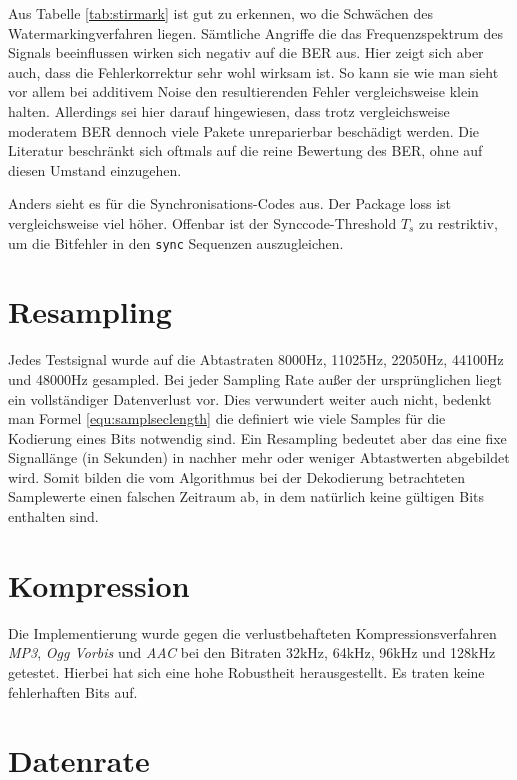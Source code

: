Aus Tabelle \ref{tab:stirmark} ist gut zu erkennen, wo die Schwächen des Watermarkingverfahren liegen. Sämtliche Angriffe die das Frequenzspektrum des Signals beeinflussen wirken sich negativ auf die BER aus. Hier zeigt sich aber auch, dass die Fehlerkorrektur sehr wohl wirksam ist. So kann sie wie man sieht vor allem bei additivem Noise den resultierenden Fehler vergleichsweise klein halten. 
Allerdings sei hier darauf hingewiesen, dass trotz vergleichsweise moderatem BER dennoch viele Pakete unreparierbar beschädigt werden. Die Literatur beschränkt sich oftmals auf die reine Bewertung des BER, ohne auf diesen Umstand einzugehen. 

Anders sieht es für die Synchronisations-Codes aus. Der Package loss ist vergleichsweise viel höher. Offenbar ist der Synccode-Threshold ${T}_{s}$ zu restriktiv, um die Bitfehler in den \texttt{sync} Sequenzen auszugleichen.

\section{Resampling}

Jedes Testsignal wurde auf die Abtastraten 8000Hz, 11025Hz, 22050Hz, 44100Hz und 48000Hz gesampled. Bei jeder Sampling Rate außer der ursprünglichen liegt ein vollständiger Datenverlust vor. Dies verwundert weiter auch nicht, bedenkt man Formel \ref{equ:samplseclength} die definiert wie viele Samples für die Kodierung eines Bits notwendig sind. Ein Resampling bedeutet aber das eine fixe Signallänge (in Sekunden) in nachher mehr oder weniger Abtastwerten abgebildet wird. Somit bilden die vom Algorithmus bei der Dekodierung betrachteten Samplewerte einen falschen Zeitraum ab, in dem natürlich keine gültigen Bits enthalten sind. 

\section{Kompression}

Die Implementierung wurde gegen die verlustbehafteten Kompressionsverfahren \textit{MP3}, \textit{Ogg Vorbis} und \textit{AAC} bei den Bitraten 32kHz, 64kHz, 96kHz und 128kHz getestet. Hierbei hat sich eine hohe Robustheit herausgestellt. Es traten keine fehlerhaften Bits auf.  

\section{Datenrate}
\label{sec:datenrate}

